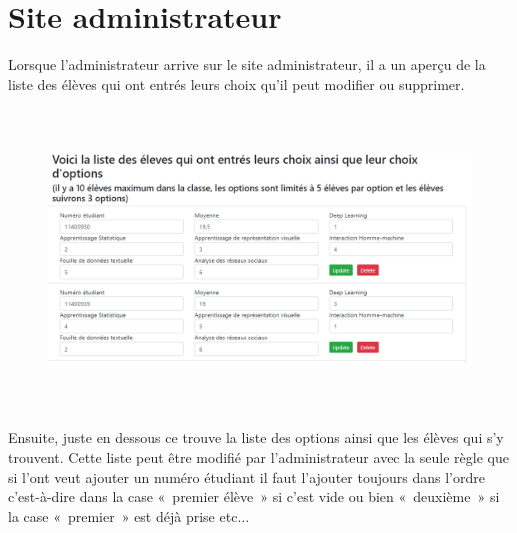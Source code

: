 \documentclass[12pt]{article}
\begin{document}

\par

\section{Site administrateur}

\vspace{\baselineskip}
\begin{adjustwidth}{0.49in}{0.0in}
Lorsque l’administrateur arrive sur le site administrateur, il a un aperçu de la liste des élèves qui ont entrés leurs choix qu’il peut modifier ou supprimer.\par

\end{adjustwidth}




\begin{figure}[H]
	\begin{Center}
		\includegraphics[width=6.3in,height=3.14in]{./media/image5.png}
	\end{Center}
\end{figure}



\par

\begin{adjustwidth}{0.49in}{0.0in}
Ensuite, juste en dessous ce trouve la liste des options ainsi que les élèves qui s’y trouvent. Cette liste peut être modifié par l’administrateur avec la seule règle que si l’ont veut ajouter un numéro étudiant il faut l’ajouter toujours dans l’ordre c’est-à-dire dans la case « premier élève » si c’est vide ou bien « deuxième » si la case « premier » est déjà prise etc$ \ldots $ \par

\end{adjustwidth}
\end{document}
